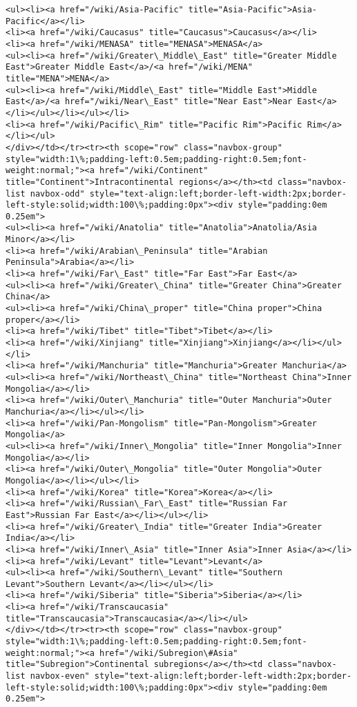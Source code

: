 \documentclass[11pt]{article}
\begin{document}
\begin{Verbatim}[commandchars=\\\{\}]
<ul><li><a href="/wiki/Asia-Pacific" title="Asia-Pacific">Asia-Pacific</a></li>
<li><a href="/wiki/Caucasus" title="Caucasus">Caucasus</a></li>
<li><a href="/wiki/MENASA" title="MENASA">MENASA</a>
<ul><li><a href="/wiki/Greater\_Middle\_East" title="Greater Middle East">Greater Middle East</a>/<a href="/wiki/MENA" title="MENA">MENA</a>
<ul><li><a href="/wiki/Middle\_East" title="Middle East">Middle East</a>/<a href="/wiki/Near\_East" title="Near East">Near East</a></li></ul></li></ul></li>
<li><a href="/wiki/Pacific\_Rim" title="Pacific Rim">Pacific Rim</a></li></ul>
</div></td></tr><tr><th scope="row" class="navbox-group" style="width:1\%;padding-left:0.5em;padding-right:0.5em;font-weight:normal;"><a href="/wiki/Continent" title="Continent">Intracontinental regions</a></th><td class="navbox-list navbox-odd" style="text-align:left;border-left-width:2px;border-left-style:solid;width:100\%;padding:0px"><div style="padding:0em 0.25em">
<ul><li><a href="/wiki/Anatolia" title="Anatolia">Anatolia/Asia Minor</a></li>
<li><a href="/wiki/Arabian\_Peninsula" title="Arabian Peninsula">Arabia</a></li>
<li><a href="/wiki/Far\_East" title="Far East">Far East</a>
<ul><li><a href="/wiki/Greater\_China" title="Greater China">Greater China</a>
<ul><li><a href="/wiki/China\_proper" title="China proper">China proper</a></li>
<li><a href="/wiki/Tibet" title="Tibet">Tibet</a></li>
<li><a href="/wiki/Xinjiang" title="Xinjiang">Xinjiang</a></li></ul></li>
<li><a href="/wiki/Manchuria" title="Manchuria">Greater Manchuria</a>
<ul><li><a href="/wiki/Northeast\_China" title="Northeast China">Inner Mongolia</a></li>
<li><a href="/wiki/Outer\_Manchuria" title="Outer Manchuria">Outer Manchuria</a></li></ul></li>
<li><a href="/wiki/Pan-Mongolism" title="Pan-Mongolism">Greater Mongolia</a>
<ul><li><a href="/wiki/Inner\_Mongolia" title="Inner Mongolia">Inner Mongolia</a></li>
<li><a href="/wiki/Outer\_Mongolia" title="Outer Mongolia">Outer Mongolia</a></li></ul></li>
<li><a href="/wiki/Korea" title="Korea">Korea</a></li>
<li><a href="/wiki/Russian\_Far\_East" title="Russian Far East">Russian Far East</a></li></ul></li>
<li><a href="/wiki/Greater\_India" title="Greater India">Greater India</a></li>
<li><a href="/wiki/Inner\_Asia" title="Inner Asia">Inner Asia</a></li>
<li><a href="/wiki/Levant" title="Levant">Levant</a>
<ul><li><a href="/wiki/Southern\_Levant" title="Southern Levant">Southern Levant</a></li></ul></li>
<li><a href="/wiki/Siberia" title="Siberia">Siberia</a></li>
<li><a href="/wiki/Transcaucasia" title="Transcaucasia">Transcaucasia</a></li></ul>
</div></td></tr><tr><th scope="row" class="navbox-group" style="width:1\%;padding-left:0.5em;padding-right:0.5em;font-weight:normal;"><a href="/wiki/Subregion\#Asia" title="Subregion">Continental subregions</a></th><td class="navbox-list navbox-even" style="text-align:left;border-left-width:2px;border-left-style:solid;width:100\%;padding:0px"><div style="padding:0em 0.25em">

\end{Verbatim}
\end{document}
